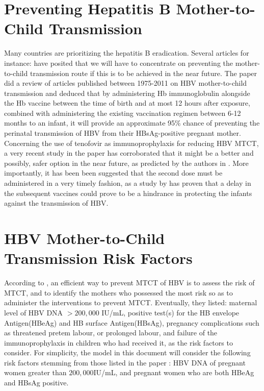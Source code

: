 \documentclass[11pt,a4paper]{article}
\begin{document}
\section{Preventing Hepatitis B Mother-to-Child Transmission}
	Many countries are prioritizing the hepatitis B eradication. Several articles for instance: \cite{andersson2015mother, xu2013nextstep,tran2009management,shimakawa2016mother} have posited that we will have to concentrate on preventing the mother-to-child transmission route if this is to be achieved in the near future. The paper \cite{Pan2012} did a review of articles published between 1975-2011 on HBV mother-to-child transmission and deduced that by administering Hb immunoglobulin alongside the Hb vaccine between the time of birth and at most 12 hours after exposure, combined with administering the existing vaccination regimen between 6-12 months to an infant, it will provide an approximate 95\% chance of preventing the perinatal transmission of HBV from their HBsAg-positive pregnant mother. Concerning the use of tenofovir as immunoprophylaxis for reducing HBV MTCT, a very recent study in the paper \cite{pan2016tenofovirToPrevent} has corroborated that it might be a better and possibly, safer option in the near future, as predicted by the authors in \cite{xu2013nextstep}. More importantly, it has been been suggested that the second dose must be administered in a very timely fashion, as a study by \cite{tharmaphornpilas2009increasedRisk} has proven that a delay in the subsequent vaccines could prove to be a hindrance in protecting the infants against the transmission of HBV.
	
	\section{HBV Mother-to-Child Transmission Risk Factors}
	According to  \cite{Pan2012}, an efficient way to prevent MTCT of HBV is to assess the risk of MTCT, and to identify the mothers who possessed the most risk so as to administer the interventions to prevent MTCT. Eventually, they listed: maternal level of HBV DNA $>200,000$ IU/mL, positive test(s) for the HB envelope Antigen(HBeAg) and HB surface Antigen(HBsAg), pregnancy complications such as threatened pretem labour, or prolonged labour, and failure of the immunoprophylaxis in children who had received it, as the risk factors to consider. For simplicity, the model in this document will consider the following risk factors stemming from those listed in the paper \cite{Pan2012}: HBV DNA of pregnant women greater than $200,000$IU/mL, and pregnant women who are both HBeAg and HBsAg positive. 
\end{document}
